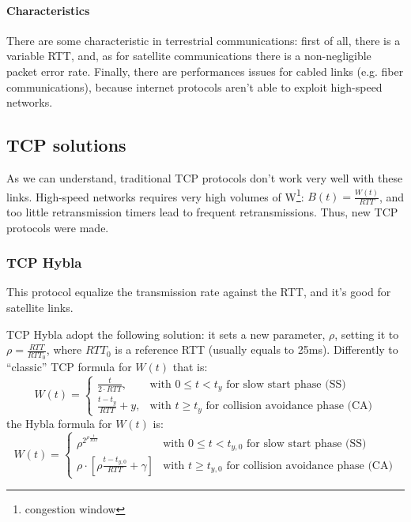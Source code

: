 \paragraph*{Characteristics} There are some characteristic in terrestrial
communications: first of all, there is a variable RTT, and, as for satellite
communications there is a non-negligible packet error rate. Finally, there are
performances issues for cabled links (e.g. fiber communications), because
internet protocols aren't able to exploit high-speed networks.

\subsection{TCP solutions}

As we can understand, traditional TCP protocols don't work very well with these
links. High-speed networks requires very high volumes of W\footnote{congestion
window}: $B(t) = \frac{W(t)}{RTT}$, and too little retransmission timers lead
to frequent retransmissions.
Thus, new TCP protocols were made.

\subsubsection{TCP Hybla}
\label{prt:tcp:hybla}

This protocol equalize the transmission rate against the RTT, and it's good for
satellite links.

TCP Hybla adopt the following solution: it sets a new parameter, $\rho$,
setting it to $\rho = \frac{RTT}{RTT_0}$, where $RTT_0$ is a reference RTT
(usually equals to 25ms).
Differently to ``classic'' TCP formula for $W(t)$ that is:
\begin{equation*}
  W(t) = \begin{cases}
    \frac{t}{2 \cdot RTT}, & \mbox{with } 0 \le t < t_y \mbox{ for slow start phase (SS)} \\
    \frac{t - t_y}{RTT} + y, & \mbox{with } t \ge t_y \mbox{ for collision avoidance phase (CA)}
  \end{cases}
\end{equation*}
the Hybla formula for $W(t)$ is:
\begin{equation}
  W(t) = \begin{cases}
    \rho^{2^{\rho \frac{t}{RTT}}} & \mbox{with } 0 \le t < t_{y,0} \mbox{ for slow start phase (SS)} \\
    \rho \cdot \left [\rho\frac{t - t_{y,0}}{RTT} + \gamma \right ] & \mbox{with } t \ge t_{y,0} \mbox{ for collision avoidance phase (CA)}
    \end{cases}
\end{equation}

